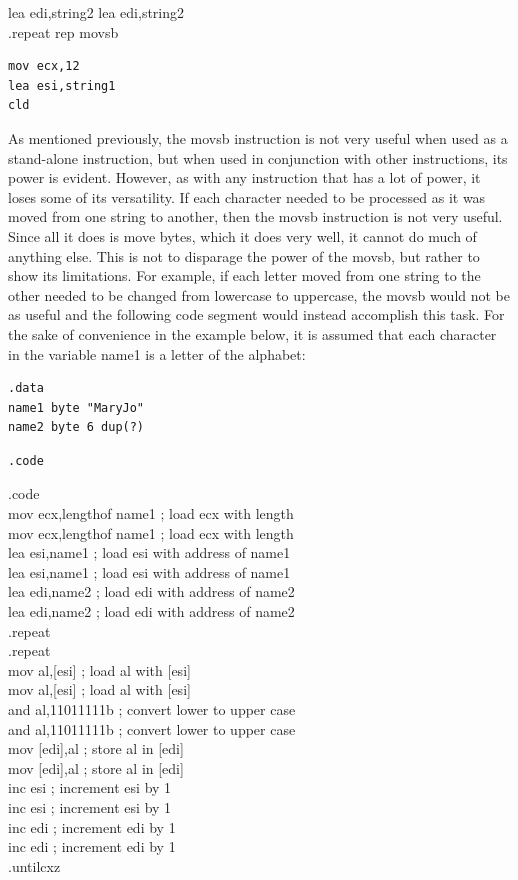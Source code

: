 \documentclass[10pt]{book}
\begin{document}
lea edi,string2 lea edi,string2\\
.repeat rep movsb

\begin{verbatim}
mov ecx,12
lea esi,string1
cld
\end{verbatim}

As mentioned previously, the movsb instruction is not very useful when used as a stand-alone instruction, but when used in conjunction with other instructions, its power is evident. However, as with any instruction that has a lot of power, it loses some of its versatility. If each character needed to be processed as it was moved from one string to another, then the movsb instruction is not very useful. Since all it does is move bytes, which it does very well, it cannot do much of anything else. This is not to disparage the power of the movsb, but rather to show its limitations. For example, if each letter moved from one string to the other needed to be changed from lowercase to uppercase, the movsb would not be as useful and the following code segment would instead accomplish this task. For the sake of convenience in the example below, it is assumed that each character in the variable name1 is a letter of the alphabet:

\begin{verbatim}
.data
name1 byte "MaryJo"
name2 byte 6 dup(?)
\end{verbatim}

\begin{verbatim}
.code
\end{verbatim}

.code\\
mov ecx,lengthof name1 ; load ecx with length\\

mov ecx,lengthof name1 ; load ecx with length\\
lea esi,name1 ; load esi with address of name1\\
lea esi,name1 ; load esi with address of name1\\
lea edi,name2 ; load edi with address of name2\\
lea edi,name2 ; load edi with address of name2\\
.repeat\\
.repeat\\[0pt]
mov al,[esi] ; load al with [esi]\\[0pt]
mov al,[esi] ; load al with [esi]\\
and al,11011111b ; convert lower to upper case\\
and al,11011111b ; convert lower to upper case\\[0pt]
mov [edi],al ; store al in [edi]\\[0pt]
mov [edi],al ; store al in [edi]\\
inc esi ; increment esi by 1\\
inc esi ; increment esi by 1\\
inc edi ; increment edi by 1\\
inc edi ; increment edi by 1\\
.untilcxz
\end{document}
